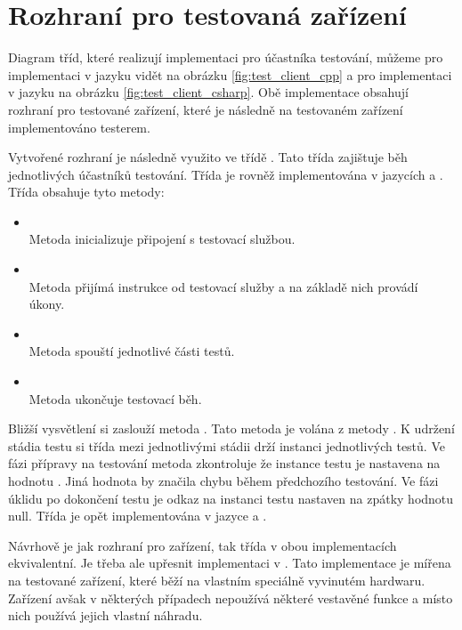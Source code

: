 \section{Rozhraní pro testovaná zařízení}\label{sec:testrunner}

Diagram tříd, které realizují implementaci pro účastníka testování, můžeme pro implementaci v jazyku \cpp{} vidět na obrázku \ref{fig:test_client_cpp} a pro implementaci v jazyku \csharp{} na obrázku \ref{fig:test_client_csharp}. Obě implementace obsahují rozhraní pro testované zařízení, které je následně na testovaném zařízení implementováno testerem.

Vytvořené rozhraní je následně využito ve třídě . Tato třída zajištuje běh jednotlivých účastníků testování. Třída je rovněž implementována v jazycích \csharp{} a \cpp{}. Třída obsahuje tyto metody: 

\begin{itemize}
    \item {} \\ Metoda inicializuje připojení s testovací službou.
    \item {} \\ Metoda přijímá instrukce od testovací služby a na základě nich provádí úkony.
    \item {} \\ Metoda spouští jednotlivé části testů. 
    \item {} \\ Metoda ukončuje testovací běh.
\end{itemize}

Bližší vysvětlení si zaslouží metoda . Tato metoda je volána z metody . K udržení stádia testu si třída mezi jednotlivými stádii drží instanci jednotlivých testů. Ve fázi přípravy na testování metoda zkontroluje že instance testu je nastavena na hodnotu . Jiná hodnota by značila chybu během předchozího testování. Ve fázi úklidu po dokončení testu je odkaz na instanci testu nastaven na zpátky hodnotu null. Třída  je opět implementována v jazyce \csharp{} a \cpp{}.

Návrhově je jak rozhraní pro zařízení, tak třída  v obou implementacích ekvivalentní. Je třeba ale upřesnit implementaci v \cpp{}. Tato implementace je mířena na testované zařízení, které běží na vlastním speciálně vyvinutém hardwaru. Zařízení avšak v některých případech nepoužívá některé vestavěné funkce a místo nich používá jejich vlastní náhradu. 

